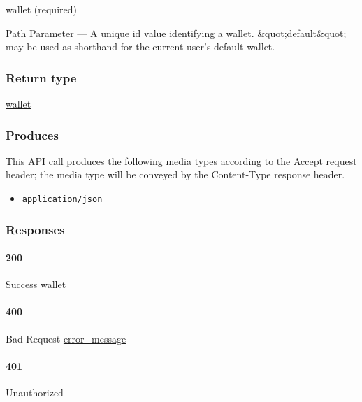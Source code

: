 wallet (required)

{Path Parameter} --- A unique id value identifying a wallet.
\&quot;default\&quot; may be used as shorthand for the current user's
default wallet.

\hypertarget{return-type-106}{%
\subsubsection{Return type}\label{return-type-106}}

\protect\hyperlink{wallet}{wallet}

\hypertarget{produces-136}{%
\subsubsection{Produces}\label{produces-136}}

This API call produces the following media types according to the
{Accept} request header; the media type will be conveyed by the
{Content-Type} response header.

\begin{itemize}
\tightlist
\item
  \texttt{application/json}
\end{itemize}

\hypertarget{responses-139}{%
\subsubsection{Responses}\label{responses-139}}

\hypertarget{section-452}{%
\paragraph{200}\label{section-452}}

Success \protect\hyperlink{wallet}{wallet}

\hypertarget{section-453}{%
\paragraph{400}\label{section-453}}

Bad Request \protect\hyperlink{error_message}{error\_message}

\hypertarget{section-454}{%
\paragraph{401}\label{section-454}}

Unauthorized \protect\hyperlink{}{}

